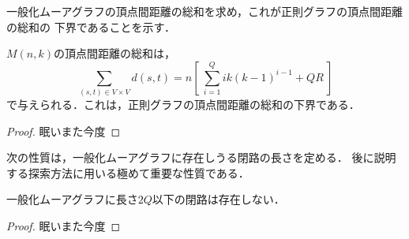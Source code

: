 一般化ムーアグラフの頂点間距離の総和を求め，これが正則グラフの頂点間距離の総和の
下界であることを示す．
\begin{theorem}
  \label{theorem:gmg-lower-bound}
  $M(n,k)$の頂点間距離の総和は，
  \[\sum_{(s,t)\in V\times V}d(s,t) =
  n \left[\ \sum^{Q}_{i=1}ik(k-1)^{i-1} + QR\ \right] \]
  で与えられる．これは，正則グラフの頂点間距離の総和の下界である．
\end{theorem}
\begin{proof}
  眠いまた今度
\end{proof}

次の性質は，一般化ムーアグラフに存在しうる閉路の長さを定める．
後に説明する探索方法に用いる極めて重要な性質である．
\begin{theorem}
  \label{theorem:gmg-geometric-property}
  一般化ムーアグラフに長さ$2Q$以下の閉路は存在しない．

\end{theorem}
\begin{proof}
  眠いまた今度
\end{proof}
